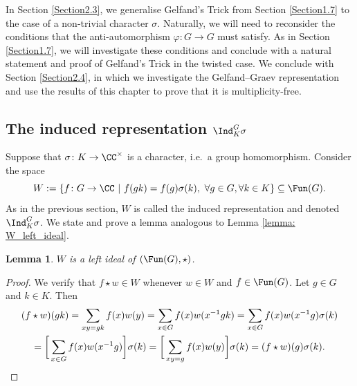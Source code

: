 \documentclass[11pt]{amsart}
\newtheorem{lem}[thm]{Lemma}
\theoremstyle{remark}
\begin{document}
In Section \ref{Section2.3}, we generalise Gelfand's Trick from Section \ref{Section1.7} to the case of a non-trivial character $\sigma$.
Naturally, we will need to reconsider the conditions that the anti-automorphism $\varphi\colon G\to G$ must satisfy.
As in Section \ref{Section1.7}, we will investigate these conditions and conclude with a natural statement and proof of Gelfand's Trick in the twisted case.
We conclude with Section \ref{Section2.4}, in which we investigate the Gelfand--Graev representation and use the results of this chapter to prove that it is multiplicity-free.


\subsection{The induced representation $\Ind_K^G \sigma$}\label{Section2.1}
Suppose that $\sigma\colon K \to\CC^\times$ is a character, i.e.\ a group homomorphism.
Consider the space
\[
	W := \{f\colon G\to \CC\ |\ f(gk) = f(g)\sigma(k),\ \forall g\in G, \forall k \in K\} \subseteq \Fun(G).
\]
As in the previous section, $W$ is called the induced representation and denoted $\Ind_K^G \sigma$.
We state and prove a lemma analogous to Lemma \ref{lemma: W_left_ideal}.
\begin{lem}\label{lemma: W_left_ideal_two}
	$W$ is a left ideal of $(\Fun(G),\star)$.
\end{lem}
\begin{proof}
	We verify that $f\star w\in W$ whenever $w\in W$ and $f\in\Fun(G)$.
	Let $g\in G$ and $k\in K$.
	Then
	\begin{multline*}
		(f\star w)(gk) = \sum_{xy=gk} f(x)w(y) = \sum_{x\in G} f(x)w(x^{-1}gk) = \sum_{x\in G} f(x)w(x^{-1}g)\sigma(k) \\
		= \bigg[\sum_{x\in G} f(x)w(x^{-1}g)\bigg]\sigma(k) = \bigg[\sum_{xy=g} f(x)w(y)\bigg]\sigma(k) = (f\star w)(g)\sigma(k).\qedhere
	\end{multline*}
\end{proof}

\end{document}
